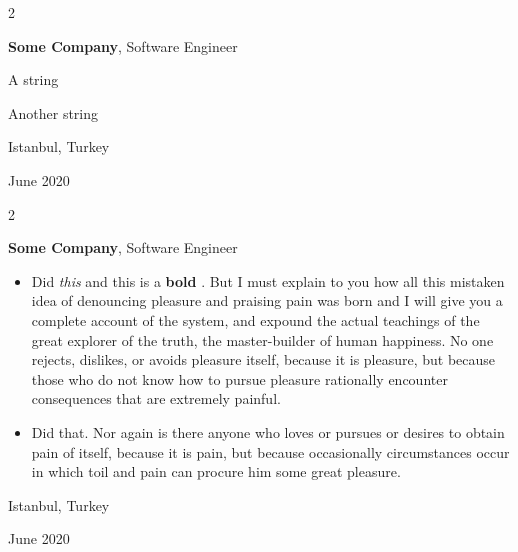 \documentclass[10pt, letterpaper]{article}
\newenvironment{summary}{
    \begin{description}[
        topsep=0.10 cm,
        parsep=0.10 cm,
        partopsep=0pt,
        itemsep=0pt,
        leftmargin=0.4 cm + 10pt
    ]
}{
    \end{description}
} %
\newenvironment{highlights}{
    \begin{itemize}[
        topsep=0.10 cm,
        parsep=0.10 cm,
        partopsep=0pt,
        itemsep=0pt,
        leftmargin=0.4 cm + 10pt
    ]
}{
    \end{itemize}
} %
\newenvironment{twocolentry}[2][]{
    \onecolentry
    \def\secondColumn{#2}
    \setcolumnwidth{\fill, 4.5 cm}
    \begin{paracol}{2}
}{
    \switchcolumn \raggedleft \secondColumn
    \end{paracol}
    \endonecolentry
} %
\let\hrefWithoutArrow\href
\renewcommand{\href}[2]{\hrefWithoutArrow{#1}{\ifthenelse{\equal{#2}{}}{ }{#2 }\raisebox{.15ex}{\footnotesize \faExternalLink*}}}
\begin{document}
        \vspace{0.2 cm}

        \begin{twocolentry}{
            Istanbul, Turkey

        June 2020
        }
            \textbf{Some \textnormal{Company}}, Software Engineer
            \begin{summary}
                \item A string
                \item Another string
            \end{summary}
        \end{twocolentry}


        \vspace{0.2 cm}

        \begin{twocolentry}{
            Istanbul, Turkey

        June 2020
        }
            \textbf{Some \textnormal{Company}}, Software Engineer
            \begin{highlights}
                \item Did \textit{this} and this is a \textbf{bold} \href{https://example.com}{link}. But I must explain to you how all this mistaken idea of denouncing pleasure and praising pain was born and I will give you a complete account of the system, and expound the actual teachings of the great explorer of the truth, the master-builder of human happiness. No one rejects, dislikes, or avoids pleasure itself, because it is pleasure, but because those who do not know how to pursue pleasure rationally encounter consequences that are extremely painful.
                \item Did that. Nor again is there anyone who loves or pursues or desires to obtain pain of itself, because it is pain, but because occasionally circumstances occur in which toil and pain can procure him some great pleasure.
            \end{highlights}
        \end{twocolentry}


        \vspace{0.2 cm}
\end{document}
